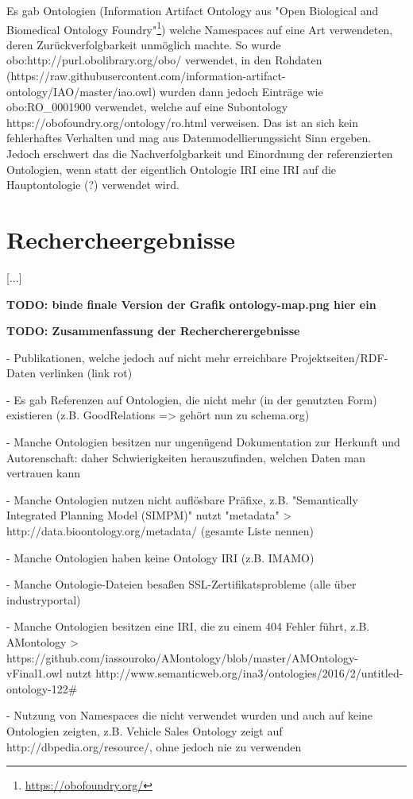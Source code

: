 \documentclass{article}
\begin{document}
Es gab Ontologien (Information Artifact Ontology aus "Open Biological and Biomedical Ontology Foundry"\footnote{\url{https://obofoundry.org/}}) welche Namespaces auf eine Art verwendeten, deren Zurückverfolgbarkeit unmöglich machte.
So wurde obo:http://purl.obolibrary.org/obo/ verwendet, in den Rohdaten (https://raw.githubusercontent.com/information-artifact-ontology/IAO/master/iao.owl) wurden dann jedoch Einträge wie obo:RO\_0001900 verwendet, welche auf eine Subontology https://obofoundry.org/ontology/ro.html verweisen.
Das ist an sich kein fehlerhaftes Verhalten und mag aus Datenmodellierungssicht Sinn ergeben.
Jedoch erschwert das die Nachverfolgbarkeit und Einordnung der referenzierten Ontologien, wenn statt der eigentlich Ontologie IRI eine IRI auf die Hauptontologie (?) verwendet wird.

\section{Rechercheergebnisse}

[...]

\textbf{TODO: binde finale Version der Grafik ontology-map.png hier ein}

\textbf{TODO: Zusammenfassung der Rechercherergebnisse}

- Publikationen, welche jedoch auf nicht mehr erreichbare Projektseiten/RDF-Daten verlinken (link rot)

- Es gab Referenzen auf Ontologien, die nicht mehr (in der genutzten Form) existieren (z.B. GoodRelations => gehört nun zu schema.org)

- Manche Ontologien besitzen nur ungenügend Dokumentation zur Herkunft und Autorenschaft: daher Schwierigkeiten herauszufinden, welchen Daten man vertrauen kann

- Manche Ontologien nutzen nicht auflösbare Präfixe, z.B. "Semantically Integrated Planning Model (SIMPM)" nutzt "metadata" > http://data.bioontology.org/metadata/ (gesamte Liste nennen)

- Manche Ontologien haben keine Ontology IRI (z.B. IMAMO)

- Manche Ontologie-Dateien besaßen SSL-Zertifikatsprobleme (alle über industryportal)

- Manche Ontologien besitzen eine IRI, die zu einem 404 Fehler führt, z.B. AMontology > https://github.com/iassouroko/AMontology/blob/master/AMOntology-vFinal1.owl nutzt http://www.semanticweb.org/ina3/ontologies/2016/2/untitled-ontology-122\#

- Nutzung von Namespaces die nicht verwendet wurden und auch auf keine Ontologien zeigten, z.B. Vehicle Sales Ontology zeigt auf http://dbpedia.org/resource/, ohne jedoch nie zu verwenden
\end{document}
